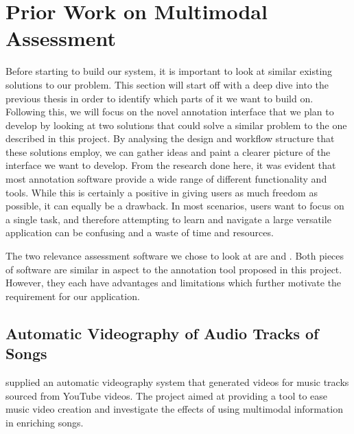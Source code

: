 \documentclass{l4proj}
\begin{document}
\section{Prior Work on Multimodal Assessment}
Before starting to build our system, it is important to look at similar existing solutions to our problem. This section will start off with a deep dive into the previous thesis in order to identify which parts of it we want to build on. Following this, we will focus on the novel annotation interface that we plan to develop by looking at two solutions that could solve a similar problem to the one described in this project. By analysing the design and workflow structure that these solutions employ, we can gather ideas and paint a clearer picture of the interface we want to develop. From the research done here, it was evident that most annotation software provide a wide range of different functionality and tools. While this is certainly a positive in giving users as much freedom as possible, it can equally be a drawback. In most scenarios, users want to focus on a single task, and therefore attempting to learn and navigate a large versatile application can be confusing and a waste of time and resources.

The two relevance assessment software we chose to look at are \textbf{\cite{labelbox}} and \textbf{\cite{superannotate}}. Both pieces of software are similar in aspect to the annotation tool proposed in this project. However, they each have advantages and limitations which further motivate the requirement for our application.

\subsection{Automatic Videography of Audio Tracks of Songs}
\label{sec:background_parker}
\cite{parker} supplied an automatic videography system that generated videos for music tracks sourced from YouTube videos. The project aimed at providing a tool to ease music video creation and investigate the effects of using multimodal information in enriching songs.
\end{document}
